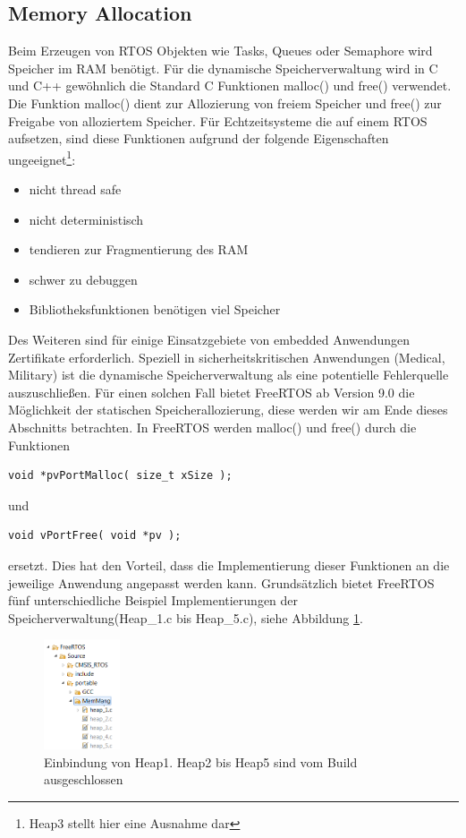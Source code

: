 \subsection{Memory Allocation}
Beim Erzeugen von RTOS Objekten wie Tasks, Queues oder Semaphore wird Speicher im RAM benötigt. Für die dynamische Speicherverwaltung wird in C und C++ ge\-wöhnlich die Standard C Funktionen malloc() und free() verwendet. Die Funktion malloc() dient zur Allozierung von freiem Speicher und free() zur Freigabe von alloziertem Speicher. Für Echtzeitsysteme die auf einem RTOS aufsetzen, sind diese Funktionen aufgrund der folgende Eigenschaften\cite{MasteringFreeRtos} ungeeignet\footnote{Heap3 stellt hier eine Ausnahme dar}:
\begin{itemize}
	\item nicht thread safe
	\item nicht deterministisch
	\item tendieren zur Fragmentierung des RAM
	\item schwer zu debuggen
	\item Bibliotheksfunktionen benötigen viel Speicher
\end{itemize}
Des Weiteren sind für einige Einsatzgebiete von embedded Anwendungen Zertifikate erforderlich. Speziell in sicherheitskritischen Anwendungen (Medical, Military) ist die dynamische Speicherverwaltung als eine potentielle Fehlerquelle auszuschließen. Für einen solchen Fall bietet FreeRTOS ab Version 9.0 die Möglichkeit der statischen Speicherallozierung, diese werden wir am Ende dieses Abschnitts betrachten. In FreeRTOS werden malloc() und free() durch die Funktionen  
\begin{lstlisting}[label=lst:vPortMalloc, numbers = none]
void *pvPortMalloc( size_t xSize );
\end{lstlisting}
und
\begin{lstlisting}[label=lst:vPortFree, numbers = none]
void vPortFree( void *pv );
\end{lstlisting}
ersetzt. Dies hat den Vorteil, dass die Implementierung dieser Funktionen an die jeweilige Anwendung angepasst werden kann. Grundsätzlich bietet FreeRTOS fünf unterschiedliche Beispiel Implementierungen der Speicherverwaltung(Heap\_1.c bis Heap\_5.c), siehe Abbildung \ref{fig:HeapsEclipse}. 
\begin{figure}[htb!]
	\centering
		\includegraphics[width=0.2\textwidth]{Pictures/Eclipse/Heaps.png}
	\caption{Einbindung von Heap1. Heap2 bis Heap5 sind vom Build ausgeschlossen}
	\label{fig:HeapsEclipse}
\end{figure}

